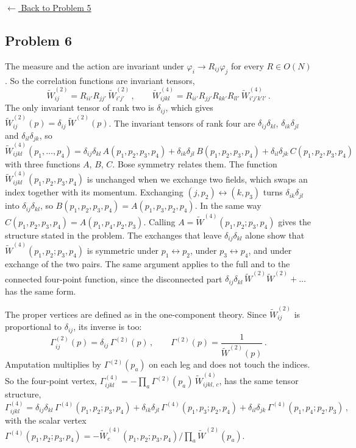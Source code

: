 \noindent\hyperref[hw:5]{$\leftarrow$ Back to Problem 5}

\subsection{Problem 6}\label{sol:6}

 The measure and the action are invariant under
$\varphi_i\to R_{ij}\varphi_j$ for every $R\in O(N)$. So the correlation
functions are invariant tensors,
\[
\tilde W^{(2)}_{ij}=R_{ii'}R_{jj'}\,\tilde W^{(2)}_{i'j'}\,,\qquad
\tilde W^{(4)}_{ijkl}=R_{ii'}R_{jj'}R_{kk'}R_{ll'}\,\tilde W^{(4)}_{i'j'k'l'}\,.
\]
The only invariant tensor of rank two is $\delta_{ij}$, which gives
$\tilde W^{(2)}_{ij}(p)=\delta_{ij}\,\tilde W^{(2)}(p)$. The invariant tensors of
rank four are $\delta_{ij}\delta_{kl}$, $\delta_{ik}\delta_{jl}$ and
$\delta_{il}\delta_{jk}$, so
\[
\tilde W^{(4)}_{ijkl}(p_1,\dots,p_4)=\delta_{ij}\delta_{kl}\,A(p_1,p_2,p_3,p_4)+\delta_{ik}\delta_{jl}\,B(p_1,p_2,p_3,p_4)+\delta_{il}\delta_{jk}\,C(p_1,p_2,p_3,p_4)
\]
with three functions $A$, $B$, $C$. Bose symmetry relates them. The function
$\tilde W^{(4)}_{ijkl}(p_1,p_2,p_3,p_4)$ is unchanged when we exchange two
fields, which swaps an index together with its momentum. Exchanging
$(j,p_2)\leftrightarrow(k,p_3)$ turns $\delta_{ik}\delta_{jl}$ into
$\delta_{ij}\delta_{kl}$, so $B(p_1,p_2,p_3,p_4)=A(p_1,p_3,p_2,p_4)$. In the
same way $C(p_1,p_2,p_3,p_4)=A(p_1,p_4,p_2,p_3)$. Calling
$A=\tilde W^{(4)}(p_1,p_2;p_3,p_4)$ gives the structure stated in the problem.
The exchanges that leave $\delta_{ij}\delta_{kl}$ alone show that
$\tilde W^{(4)}(p_1,p_2;p_3,p_4)$ is symmetric under $p_1\leftrightarrow p_2$,
under $p_3\leftrightarrow p_4$, and under exchange of the two pairs. The same
argument applies to the full and to the connected four-point function, since the
disconnected part $\delta_{ij}\delta_{kl}\,\tilde W^{(2)}\tilde W^{(2)}+\dots$ has
the same form.

The proper vertices are defined as in the one-component theory. Since
$\tilde W^{(2)}_{ij}$ is proportional to $\delta_{ij}$, its inverse is too:
\[
\Gamma^{(2)}_{ij}(p)=\delta_{ij}\,\Gamma^{(2)}(p)\,,\qquad\Gamma^{(2)}(p)=\frac1{\tilde W^{(2)}(p)}\,.
\]
Amputation multiplies by $\Gamma^{(2)}(p_a)$ on each leg and does not touch the
indices. So the four-point vertex,
$\Gamma^{(4)}_{ijkl}=-\prod_a\Gamma^{(2)}(p_a)\,\tilde W^{(4)}_{ijkl,\,c}$, has the
same tensor structure,
\[
\Gamma^{(4)}_{ijkl}=\delta_{ij}\delta_{kl}\,\Gamma^{(4)}(p_1,p_2;p_3,p_4)+\delta_{ik}\delta_{jl}\,\Gamma^{(4)}(p_1,p_3;p_2,p_4)+\delta_{il}\delta_{jk}\,\Gamma^{(4)}(p_1,p_4;p_2,p_3)\,,
\]
with the scalar vertex
$\Gamma^{(4)}(p_1,p_2;p_3,p_4)=-\tilde W^{(4)}_c(p_1,p_2;p_3,p_4)\big/\prod_a\tilde W^{(2)}(p_a)$.

